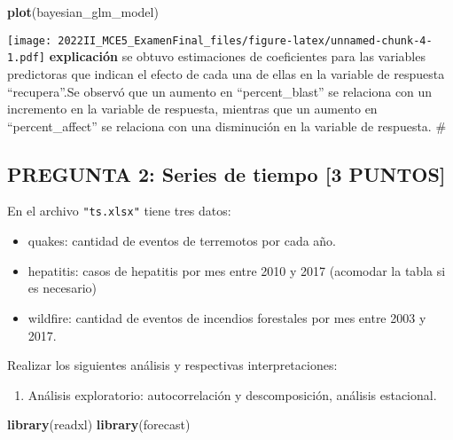 \documentclass[
]{article}
\newenvironment{Shaded}{\begin{snugshade}}{\end{snugshade}}
\newcommand{\FunctionTok}[1]{\textcolor[rgb]{0.13,0.29,0.53}{\textbf{#1}}}
\newcommand{\NormalTok}[1]{#1}
\providecommand{\tightlist}{%
  \setlength{\itemsep}{0pt}\setlength{\parskip}{0pt}}
\begin{document}
\begin{Shaded}
\begin{Highlighting}[]
\FunctionTok{plot}\NormalTok{(bayesian\_glm\_model)}
\end{Highlighting}
\end{Shaded}

\texttt{[image: 2022II\_MCE5\_ExamenFinal\_files/figure-latex/unnamed-chunk-4-1.pdf]}
\textbf{explicación} se obtuvo estimaciones de coeficientes para las
variables predictoras que indican el efecto de cada una de ellas en la
variable de respuesta ``recupera''.Se observó que un aumento en
``percent\_blast'' se relaciona con un incremento en la variable de
respuesta, mientras que un aumento en ``percent\_affect'' se relaciona
con una disminución en la variable de respuesta. \#

\hypertarget{pregunta-2-series-de-tiempo-3-puntos}{%
\subsection{\texorpdfstring{\textbf{PREGUNTA 2: Series de tiempo {[}3
PUNTOS{]}}}{PREGUNTA 2: Series de tiempo {[}3 PUNTOS{]}}}\label{pregunta-2-series-de-tiempo-3-puntos}}

En el archivo \texttt{"ts.xlsx"} tiene tres datos:

\begin{itemize}
\item
  quakes: cantidad de eventos de terremotos por cada año.
\item
  hepatitis: casos de hepatitis por mes entre 2010 y 2017 (acomodar la
  tabla si es necesario)
\item
  wildfire: cantidad de eventos de incendios forestales por mes entre
  2003 y 2017.
\end{itemize}

Realizar los siguientes análisis y respectivas interpretaciones:

\begin{enumerate}
\def\labelenumi{\arabic{enumi}.}
\tightlist
\item
  Análisis exploratorio: autocorrelación y descomposición, análisis
  estacional.
\end{enumerate}

\begin{Shaded}
\begin{Highlighting}[]
\FunctionTok{library}\NormalTok{(readxl)}
\FunctionTok{library}\NormalTok{(forecast)}
\end{Highlighting}
\end{Shaded}
\end{document}
